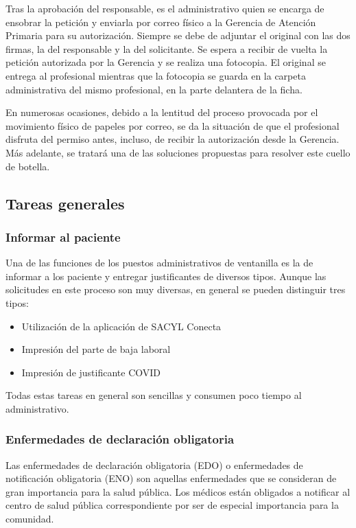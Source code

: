 Tras la aprobación del responsable, es el administrativo quien se encarga de ensobrar la petición y enviarla por correo físico a la Gerencia de Atención Primaria para su autorización.
Siempre se debe de adjuntar el original con las dos firmas, la del responsable y la del solicitante.
Se espera a recibir de vuelta la petición autorizada por la Gerencia y se realiza una fotocopia.
El original se entrega al profesional mientras que la fotocopia se guarda en la carpeta administrativa del mismo profesional, en la parte delantera de la ficha.

En numerosas ocasiones, debido a la lentitud del proceso provocada por el movimiento físico de papeles por correo, se da la situación de que el profesional disfruta del permiso antes, incluso, de recibir la autorización desde la Gerencia.
Más adelante, se tratará una de las soluciones propuestas para resolver este cuello de botella.

\subsection{Tareas generales}

\subsubsection{Informar al paciente}

Una de las funciones de los puestos administrativos de ventanilla es la de informar a los paciente y entregar justificantes de diversos tipos. Aunque las solicitudes en este proceso son muy diversas, en general se pueden distinguir tres tipos:

\begin{itemize}
    \item Utilización de la aplicación de SACYL Conecta
    \item Impresión del parte de baja laboral
    \item Impresión de justificante COVID
\end{itemize}

Todas estas tareas en general son sencillas y consumen poco tiempo al administrativo.

\subsubsection{Enfermedades de declaración obligatoria}

Las enfermedades de declaración obligatoria (EDO) o enfermedades de notificación obligatoria (ENO) son aquellas enfermedades que se consideran de gran importancia para la salud pública. Los médicos están obligados a notificar al centro de salud pública correspondiente por ser de especial importancia para la comunidad.

